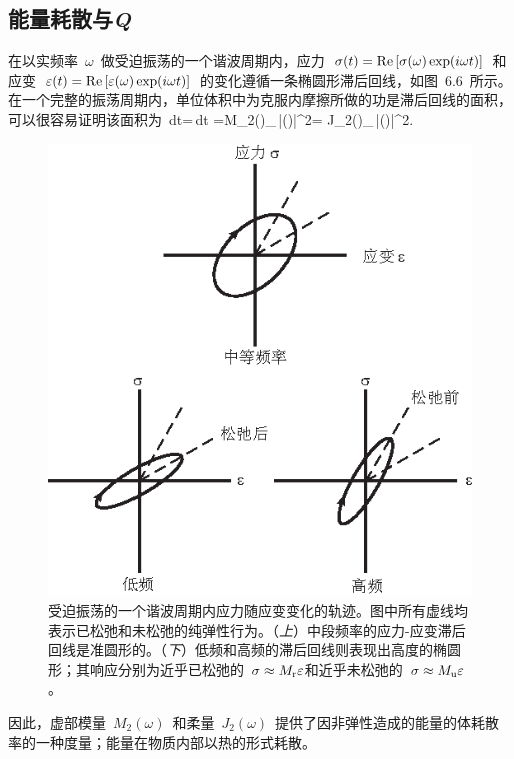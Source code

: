 \subsection{能量耗散与\textbf{\textit{Q}}}
%
%
%
%

在以实频率~$\omega$~做受迫振荡的一个谐波周期内，应力~$\sigma(t)=\Re{\rm e \,}[\sigma(\omega)\exp(i\omega t)]$~和应变~$\varepsilon(t)=\Re{\rm e \,}[\varepsilon(\omega)\exp(i\omega t)]$~的变化遵循一条椭圆形滞后回线，如图~6.6~所示。
%
在一个完整的振荡周期内，单位体积中为克服内摩擦所做的功是滞后回线的面积，可以很容易证明该面积为
\eq
\oint{}\,dt=\oint\sigma\dot{\varepsilon}\,dt
=\pi M_2(\omega)_{\,}|\varepsilon(\omega)|^2=
\pi J_2(\omega)_{\,}|\sigma(\omega)|^2.
\en
\begin{figure}[!t]
\begin{center}
\includegraphics{../figures/chap06/fig06.eps}
\end{center}
\caption[hysteresis]{
受迫振荡的一个谐波周期内应力随应变变化的轨迹。图中所有虚线均表示已松弛和未松弛的纯弹性行为。（{\em 上\/}）中段频率的应力-应变滞后回线是准圆形的。（{\em 下\/}）低频和高频的滞后回线则表现出高度的椭圆形；其响应分别为近乎已松弛的~$\sigma\approx M_{\rm r}\varepsilon$和近乎未松弛的~$\sigma\approx M_{\rm u}\varepsilon$。
}
\end{figure}
因此，虚部模量~$M_2(\omega)$~和柔量~$J_2(\omega)$~提供了因非弹性造成的能量的体耗散率的一种度量；能量在物质内部以热的形式耗散。

